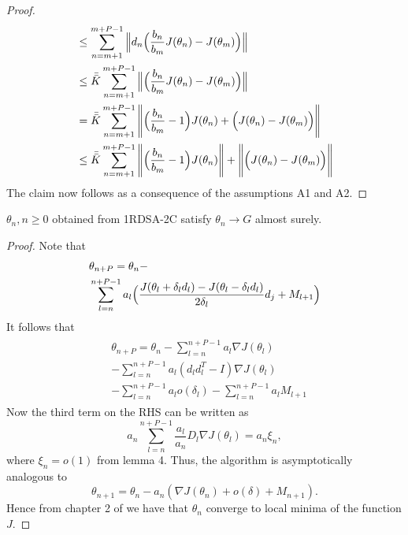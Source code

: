 \begin{proof}
\begin{align*}
  & \leq \sum_{n=m+1}^{m+P-1}\Big{\|}d_n\Big{(}\frac{b_n}{b_m}J(\theta_n)-J(\theta_{m})\Big{)}\Big{\|}\\
  & \leq \bar{\bar{K}}\sum_{n=m+1}^{m+P-1}\Big{\|}\Big{(}\frac{b_n}{b_m}J(\theta_n)-J(\theta_{m})\Big{)}\Big{\|}\\
  & =\bar{\bar{K}}\sum_{n=m+1}^{m+P-1} \Bigg{\|}\Big{(}\frac{b_n}{b_m}-1\Big{)} J(\theta_n)
  +\Big{(} J(\theta_n)-J(\theta_{m})\Big{)}\Bigg{\|}\\
  &\leq \bar{\bar{K}}\sum_{n=m+1}^{m+P-1}\Bigg{\|}\Big{(}\frac{b_n}{b_m}-1\Big{)} J(\theta_n)\Bigg{\|}
  +\Bigg{\|}\Big{(} J(\theta_n)- J(\theta_{m})\Big{)}\Bigg{\|}\\
\end{align*}
 The claim now follows as a consequence of the assumptions A1 and A2.
 \end{proof}
\begin{theorem}
 $\theta_n, n\geq0$ obtained from 1RDSA-2C satisfy $\theta_n \rightarrow G$
 almost surely.
\end{theorem}
\begin{proof}
 Note that
 \begin{align*}
  \begin{split}
  & \theta_{n+P} = \theta_n- \\ 
  &\sum_{l=n}^{n+P-1}a_l\Big{(}\frac{J(\theta_l+\delta_l d_l)-J(\theta_l-\delta_l d_l)}{2\delta_l}d_j+M_{l+1}\Big{)}
 \end{split}
 \end{align*}
It follows that
 \begin{align*}
  \begin{split}
  & \theta_{n+P} = \theta_n- \sum_{l=n}^{n+P-1}a_l\nabla J(\theta_l)\\ 
  & -\sum_{l=n}^{n+P-1}a_l(d_ld_l^T-I)\nabla J(\theta_l)\\
  & -\sum_{l=n}^{n+P-1}a_lo(\delta_l)
  -\sum_{l=n}^{n+P-1}a_lM_{l+1}
 \end{split}
 \end{align*}
Now the third term on the RHS can be written as
$$a_n\sum_{l=n}^{n+P-1}\frac{a_l}{a_n}D_{l}\nabla J(\theta_l)=a_n\xi_{n},$$
where $\xi_{n}=o(1)$ from lemma 4.
Thus, the algorithm is asymptotically analogous to
$$\theta_{n+1}=\theta_n-a_n(\nabla J(\theta_n)+o(\delta)+M_{n+1}).$$
Hence from chapter 2 of \cite{borkar2008stochastic} we have that $\theta_n$ converge to
local minima of the function $J.$
\end{proof}

